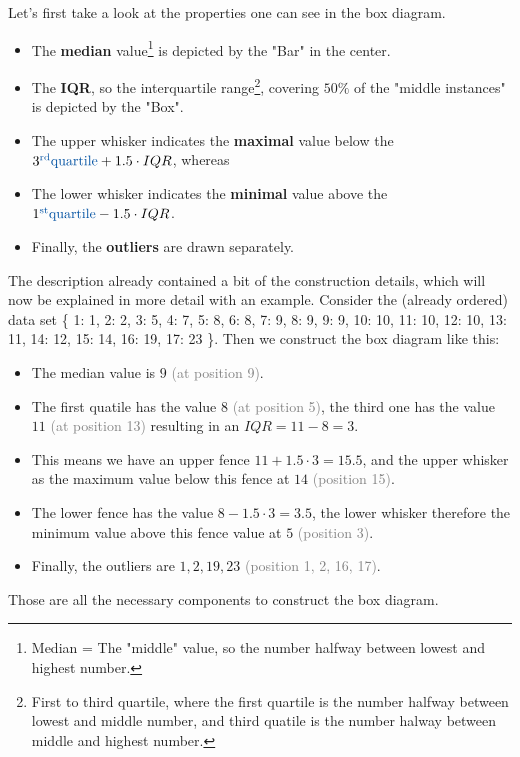Let's first take a look at the properties one can see in the box diagram. 
\begin{itemize}
  \item The \textbf{median} value\footnote{Median = The "middle" value, so the number halfway between lowest and highest number.} is depicted by the "Bar" in the center.\
  \item The \textbf{IQR}, so the interquartile range\footnote{First to third quartile, where the first quartile is the number halfway between lowest and middle number, and third quatile is the number halway between middle and highest number.}, covering $50\%$ of the "middle instances" is depicted by the "Box".
  \item The upper whisker indicates the \textbf{maximal} value below the $3^{\text{\color{mathblue}rd}} \text{\color{mathblue} quartile} + 1.5\cdot IQR$, whereas
  \item The lower whisker indicates the \textbf{minimal} value above the $1^{\text{\color{mathblue}st}} \text{\color{mathblue} quartile} - 1.5\cdot IQR$.
  \item Finally, the \textbf{outliers} are drawn separately.
\end{itemize}

The description already contained a bit of the construction details, which will now be explained in more detail with an example. Consider the (already ordered) data set \textcolor{mathblue}{\{ {\tiny \color{gray} 1: }1, {\tiny \color{gray} 2: }2, {\tiny \color{gray} 3: }5, {\tiny \color{gray} 4: }7, {\tiny \color{gray} 5: }8, {\tiny \color{gray} 6: }8, {\tiny \color{gray} 7: }9, {\tiny \color{gray} 8: }9, {\tiny \color{gray} 9: }9, {\tiny \color{gray} 10: }10, {\tiny \color{gray} 11: }10, {\tiny \color{gray} 12: }10, {\tiny \color{gray} 13: }11, {\tiny \color{gray} 14: }12, {\tiny \color{gray} 15: }14, {\tiny \color{gray} 16: }19, {\tiny \color{gray} 17: }23 \}}. Then we construct the box diagram like this:
\begin{itemize}
  \item The median value is $9$ \textcolor{gray}{\tiny(at position 9)}.
  \item The first quatile has the value $8$ \textcolor{gray}{\tiny(at position 5)}, the third one has the value $11$ \textcolor{gray}{\tiny(at position 13)} resulting in an $IQR = 11-8 = 3$.
  \item This means we have an upper fence $11 + 1.5\cdot3 = 15.5$, and the upper whisker as the maximum value below this fence at $14$ \textcolor{gray}{\tiny(position 15)}.
  \item The lower fence has the value $8 - 1.5\cdot3 = 3.5$, the lower whisker therefore the minimum value above this fence value at $5$ \textcolor{gray}{\tiny(position 3)}.
  \item Finally, the outliers are $1, 2, 19, 23$ \textcolor{gray}{\tiny(position 1, 2, 16, 17)}.
\end{itemize}
Those are all the necessary components to construct the box diagram.

